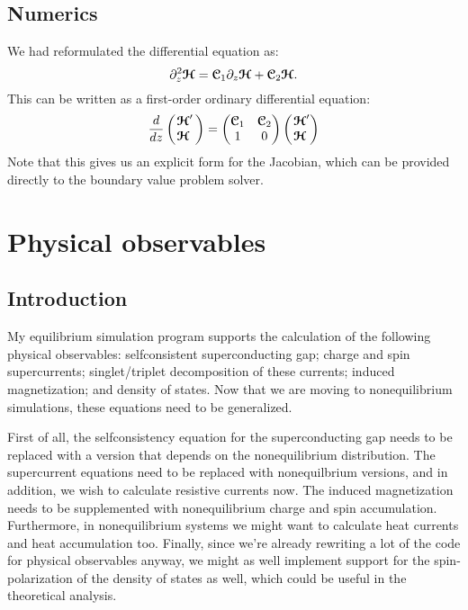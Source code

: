 \clearpage
\section{Numerics}
We had reformulated the differential equation as:
\begin{equation}
  \partial_z^2\bm{\mathcal{H}} = \bm{\mathcal{C}}_1 \partial_z \bm{\mathcal{H}} + \bm{\mathcal{C}}_2 \bm{\mathcal{H}}.
\end{equation}
This can be written as a first-order ordinary differential equation:
\begin{equation}
  \frac{d}{dz}
  \begin{pmatrix}
    \!\phantom{'}\bm{\mathcal{H}}'\, \\
    \!\bm{\mathcal{H}}\,
  \end{pmatrix}
  = 
  \begin{pmatrix}
    \bm{\mathcal{C}}_1 & \bm{\mathcal{C}}_2 \\
    1        & 0
  \end{pmatrix}
  \begin{pmatrix}
    \!\phantom{'}\bm{\mathcal{H}}' \\
    \!\bm{\mathcal{H}}
  \end{pmatrix}
\end{equation}
Note that this gives us an explicit form for the Jacobian, which can be provided directly to the boundary value problem solver.




\clearpage
\chapter{Physical observables}
\section{Introduction}
My equilibrium simulation program supports the calculation of the following physical observables:
  selfconsistent superconducting gap;
  charge and spin supercurrents;
  singlet/triplet decomposition of these currents;
  induced magnetization;
  and density of states.
Now that we are moving to nonequilibrium simulations, these equations need to be generalized.

First of all, the selfconsistency equation for the superconducting gap needs to be replaced with a version that depends on the nonequilibrium distribution.
The supercurrent equations need to be replaced with nonequilbrium versions, and in addition, we wish to calculate resistive currents now.
The induced magnetization needs to be supplemented with nonequilibrium charge and spin accumulation.
Furthermore, in nonequilibrium systems we might want to calculate heat currents and heat accumulation too.
Finally, since we're already rewriting a lot of the code for physical observables anyway, we might as well implement support for the spin-polarization of the density of states as well, which could be useful in the theoretical analysis.


